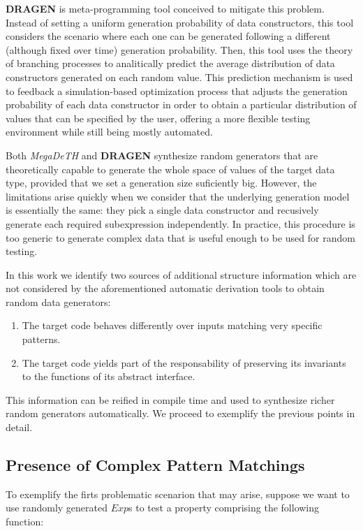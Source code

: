 \documentclass[conference, fleqn]{IEEEtran}
\newcommand{\Conid}[1]{\mathit{#1}}
\newcommand{\megadeth}{\emph{MegaDeTH}\xspace}
\newcommand{\dragen}{\textbf{DRAGEN}\xspace}
\begin{document}
\dragen is meta-programming tool conceived to mitigate this problem.
%
Instead of setting a uniform generation probability of data constructors, this
tool considers the scenario where each one can be generated following a
different (although fixed over time) generation probability.
%
Then, this tool uses the theory of branching processes to analitically predict
the average distribution of data constructors generated on each random value.
%
This prediction mechanism is used to feedback a simulation-based optimization
process that adjusts the generation probability of each data constructor in
order to obtain a particular distribution of values that can be specified by the
user, offering a more flexible testing environment while still being mostly
automated.


Both \megadeth and \dragen synthesize random generators that are theoretically
capable to generate the whole space of values of the target data type, provided
that we set a generation size suficiently big.
%
However, the limitations arise quickly when we consider that the underlying
generation model is essentially the same: they pick a single data constructor
and recusively generate each required subexpression independently.
%
In practice, this procedure is too generic to generate complex data that is
useful enough to be used for random testing.


In this work we identify two sources of additional structure information which
are not considered by the aforementioned automatic derivation tools to obtain
random data generators:

\begin{enumerate}
\item The target code behaves differently over inputs matching very specific
  patterns.
\item The target code yields part of the responsability of preserving its
  invariants to the functions of its abstract interface.
\end{enumerate}

This information can be reified in compile time and used to synthesize richer
random generators automatically. We proceed to exemplify the previous points in
detail.

\subsection{\textbf{Presence of Complex Pattern Matchings}}

To exemplify the firts problematic scenarion that may arise, suppose we want to
use randomly generated \ensuremath{\Conid{Exp}}s to test a property comprising the following
function:
\end{document}

